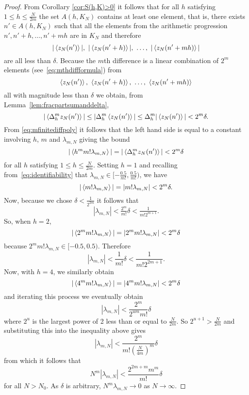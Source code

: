 \documentclass[journal]{IEEEtran}
\begin{document}
\begin{proof}
From Corollary \ref{cor:S(h,K)>0} it follows that for all $h$ satisfying $1\leq h \leq\frac{N}{2m}$ the set $A(h,K_N)$ contains at least one element, that is, there exists $n' \in A(h,K_N)$ such that all the elements from the arithmetic progression $n', n'+h, \dots, n' + mh$ are in $K_N$ and therefore 
\[
\vert \left\langle z_N(n') \right\rangle \vert,\,\, \vert \left\langle z_N(n'+h) \right\rangle \vert, \,\, \dots, \,\, \vert \left\langle z_N(n'+mh) \right\rangle \vert 
\] 
are all less than $\delta$.  Because the $m$th difference is a linear combination of $2^{m}$ elements (see~\eqref{eq:mthdiffformula}) from 
\[
\left\langle z_N(n') \right\rangle, \,\, \left\langle z_N(n'+h) \right\rangle, \,\, \dots, \,\, \left\langle z_N(n'+mh) \right\rangle
\]
all with magnitude less than $\delta$ we obtain, from Lemma~\ref{lem:fracpartsumanddelta},
\begin{equation}\label{eq:Deltazfracbound}
|\fracpart{\Delta_h^m z_N(n')}| \leq |\Delta_h^m \fracpart{ z_N(n')}| \leq \Delta_h^m |\fracpart{ z_N(n')}|< 2^{m}\delta.
\end{equation}
From \eqref{eq:mfinitediffpoly} it follows that the left hand side is equal to a constant involving $h$, $m$ and $\lambda_{m,N}$ giving the bound
\begin{equation}\label{eq:startiterativearg}
|\fracpart{ h^m m! \lambda_{m,N} }|  = |\fracpart{   \Delta_h^m z_N(n') }| < 2^m\delta
\end{equation}
for all $h$ satisfying $1\leq h \leq\frac{N}{2m}$. Setting $h = 1$ and recalling from~\eqref{eq:identifiability} that $\lambda_{m,N} \in [-\tfrac{0.5}{m!}, \tfrac{0.5}{m!})$, we have
 \[
 |\left\langle  m! \lambda_{m,N}  \right\rangle| = | m! \lambda_{m,N} |< 2^m\delta.
 \]
Now, because we chose $\delta < \tfrac{1}{2^{2m}}$ it follows that 
\[
| \lambda_{m,N} |< \tfrac{2^m}{m!}\delta < \tfrac{1}{m! 2^{m+1}}.
\]
So, when $h = 2$, 
\[
|\left\langle  2^m m! \lambda_{m,N}  \right\rangle| = | 2^m m! \lambda_{m,N} |< 2^m\delta
\]
because $2^m m! \lambda_{m,N} \in [-0.5, 0.5)$. Therefore
\[
| \lambda_{m,N} |< \frac{1}{m!}\delta < \frac{1}{m! 2^{2m+1}}.
\]
Now, with $h = 4$, we similarly obtain 
\[
|\left\langle  4^m m! \lambda_{m,N}  \right\rangle| = | 4^m m! \lambda_{m,N} |< 2^m\delta
\]
and iterating this process we eventually obtain 
\[
| \lambda_{m,N} | < \frac{2^m}{2^{um} m!}\delta
\]
where $2^u$ is the largest power of 2 less than or equal to $\tfrac{N}{2m}$.  So $2^{u+1} > \frac{N}{2m}$ and substituting this into the inequality above gives 
 \[ 
 |\lambda_{m,N}| < \frac{2^m}{ m! \left(\frac{N}{4m}\right)^m}\delta
 \]
from which it follows that 
 \begin{equation}\label{eq:enditerativearg}
 N^m|\lambda_{m,N}| < \frac{2^{2m+m}m^m}{m!}\delta
 \end{equation}
for all $N > N_0$.  As $\delta$ is arbitrary, $N^m \lambda_{m,N} \rightarrow 0$ as $N\rightarrow \infty$.


\end{proof}
\end{document}
